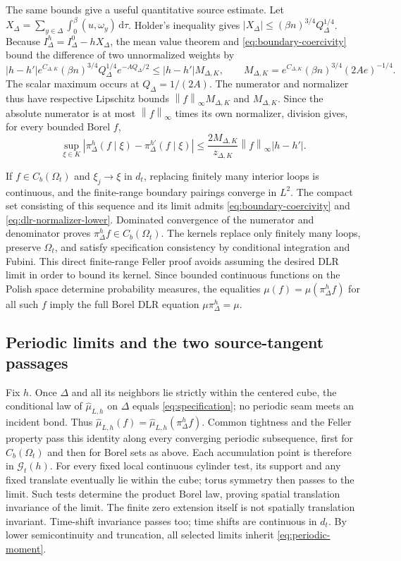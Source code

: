 \documentclass[11pt]{article}
\numberwithin{equation}{section}
\theoremstyle{definition}
\newcommand{\dd}{\,\mathrm d}
\newcommand{\norm}[1]{\left\lVert#1\right\rVert}
\newcommand{\cG}{\mathcal G}
\begin{document}
The same bounds give a useful quantitative source estimate.  Let
$X_\Delta=\sum_{y\in\Delta}\int_0^\beta(u,\omega_y)\dd\tau$.
Holder's inequality gives $|X_\Delta|\leq(\beta n)^{3/4}Q_\Delta^{1/4}$.
Because $I_\Delta^h=I_\Delta^0-hX_\Delta$, the mean value theorem and
\eqref{eq:boundary-coercivity} bound the difference of two unnormalized
weights by
\[
 |h-h'|e^{C_{\Delta,K}}(\beta n)^{3/4}
          Q_\Delta^{1/4}e^{-A Q_\Delta/2}
 \leq |h-h'|M_{\Delta,K},\qquad
 M_{\Delta,K}=e^{C_{\Delta,K}}(\beta n)^{3/4}(2Ae)^{-1/4}.
\]
The scalar maximum occurs at $Q_\Delta=1/(2A)$.  The numerator and
normalizer thus have respective Lipschitz bounds
$\norm f_\infty M_{\Delta,K}$ and $M_{\Delta,K}$.  Since the absolute
numerator is at most $\norm f_\infty$ times its own normalizer, division
gives, for every bounded Borel $f$,
\begin{equation}
 \sup_{\xi\in K}|\pi_\Delta^h(f\mid\xi)-\pi_\Delta^{h'}(f\mid\xi)|
 \leq\frac{2M_{\Delta,K}}{z_{\Delta,K}}\norm f_\infty|h-h'|.
 \label{eq:kernel-source-lipschitz}
\end{equation}

If $f\in C_b(\Omega_t)$ and $\xi_j\to\xi$ in $d_t$, replacing finitely
many interior loops is continuous, and the finite-range boundary pairings
converge in $L^2$.  The compact set consisting of this sequence and its
limit admits \eqref{eq:boundary-coercivity} and
\eqref{eq:dlr-normalizer-lower}.  Dominated convergence of the numerator
and denominator proves $\pi_\Delta^h f\in C_b(\Omega_t)$.
The kernels replace only finitely many loops, preserve $\Omega_t$, and
satisfy specification consistency by conditional integration and Fubini.
This direct finite-range Feller proof avoids assuming the desired DLR
limit in order to bound its kernel.  Since bounded continuous functions on
the Polish space determine probability measures, the equalities
$\mu(f)=\mu(\pi_\Delta^h f)$ for all such $f$ imply the full Borel DLR
equation $\mu\pi_\Delta^h=\mu$.

\subsection{Periodic limits and the two source-tangent passages}
\label{sec:dlr-source-tangents}

Fix $h$.  Once $\Delta$ and all its neighbors lie strictly within the
centered cube, the conditional law of $\widehat\mu_{L,h}$ on $\Delta$
equals \eqref{eq:specification}; no periodic seam meets an incident bond.
Thus $\widehat\mu_{L,h}(f)=\widehat\mu_{L,h}(\pi_\Delta^h f)$.
Common tightness and the Feller property pass this identity along every
converging periodic subsequence, first for $C_b(\Omega_t)$ and then for
Borel sets as above.  Each accumulation point is therefore in $\cG_t(h)$.
For every fixed local continuous cylinder test, its support and any fixed
translate eventually lie within the cube; torus symmetry then passes to
the limit.  Such tests determine the product Borel law, proving spatial
translation invariance of the limit.  The finite zero extension itself is
not spatially translation invariant.  Time-shift invariance passes too;
time shifts are continuous in $d_t$.  By lower semicontinuity and truncation,
all selected limits inherit \eqref{eq:periodic-moment}.
\end{document}
